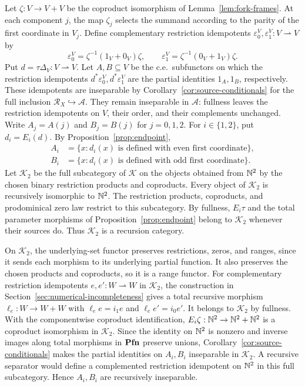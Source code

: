 Let $\zeta:V\to V+V$ be the coproduct isomorphism of
Lemma~\ref{lem:fork-frames}. At each component $j$, the map
$\zeta_j$ selects the summand according to the parity of the
first coordinate in $V_j$. Define complementary restriction idempotents
$\varepsilon^V_0,\varepsilon^V_1:V\rightharpoonup V$ by
\[
 \varepsilon^V_0=\zeta^{-1}(1_V+0_V)\zeta,\qquad
 \varepsilon^V_1=\zeta^{-1}(0_V+1_V)\zeta.
\]
Put $d=\tau\Delta_V:V\rightharpoonup V$. Let $A,B\subseteq V$ be the
c.e.\ subfunctors on which the restriction idempotents
$d^*\varepsilon^V_0,d^*\varepsilon^V_1$ are the partial identities
$1_A,1_B$, respectively. These idempotents are inseparable by
Corollary~\ref{cor:source-conditionals} for the full inclusion
$\mathscr R_X\hookrightarrow\mathcal A$. They remain inseparable
in $\mathcal A$: fullness leaves the restriction idempotents on $V$, their order,
and their complements unchanged.
Write $A_j=A(j)$ and $B_j=B(j)$
for $j=0,1,2$. For $i\in\{1,2\}$, put $d_i=E_i(d)$.
By Proposition~\ref{prop:endpoint},
\begin{align*}
 A_i&=\{x:d_i(x)\text{ is defined with even first coordinate}\},\\
 B_i&=\{x:d_i(x)\text{ is defined with odd first coordinate}\}.
\end{align*}
Let $\mathcal K_2$ be the full subcategory of $\mathcal K$ on the
objects obtained from $\mathbb N^2$ by the chosen binary restriction
products and coproducts. Every object of $\mathcal K_2$ is recursively
isomorphic to $\mathbb N^2$. The restriction products, coproducts, and
prodominical zero law restrict to this subcategory. By fullness,
$E_i\tau$ and the total parameter morphisms of
Proposition~\ref{prop:endpoint} belong to $\mathcal K_2$ whenever
their sources do. Thus $\mathcal K_2$ is a recursion category.

On $\mathcal K_2$, the underlying-set functor preserves
restrictions, zeros, and ranges, since it sends each morphism to its
underlying partial function. It also preserves the chosen products
and coproducts, so it is a range functor.
For complementary restriction idempotents $e,e':W\rightharpoonup W$
in $\mathcal K_2$, the construction in
Section~\ref{sec:numerical-incompleteness} gives a total recursive
morphism $\ell_e:W\to W+W$ with
$\ell_e e=i_1e$ and $\ell_e e'=i_0e'$.
It belongs to $\mathcal K_2$ by fullness. With the componentwise coproduct
identification, $E_i\zeta:\mathbb N^2\to\mathbb N^2+\mathbb N^2$ is a coproduct
isomorphism in $\mathcal K_2$.
Since the identity on $\mathbb N^2$ is nonzero and inverse images along
total morphisms in $\mathbf{Pfn}$ preserve unions,
Corollary~\ref{cor:source-conditionals} makes the partial identities
on $A_i,B_i$ inseparable in $\mathcal K_2$. A recursive separator
would define a complemented restriction idempotent on $\mathbb N^2$ in
this full subcategory. Hence $A_i,B_i$ are recursively inseparable.

